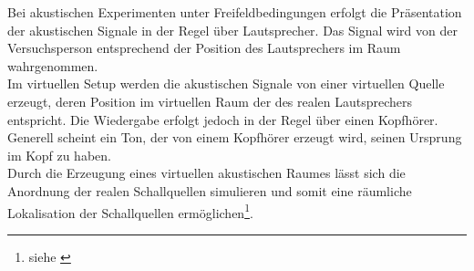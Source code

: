 

Bei akustischen Experimenten unter Freifeldbedingungen erfolgt die Präsentation der akustischen Signale in der Regel über Lautsprecher. Das Signal wird von der Versuchsperson entsprechend der Position des Lautsprechers im Raum wahrgenommen.\\
Im virtuellen Setup werden die akustischen Signale von einer virtuellen Quelle erzeugt, deren Position im virtuellen Raum der des realen Lautsprechers entspricht. Die Wiedergabe erfolgt jedoch in der Regel über einen Kopfhörer. Generell scheint ein Ton, der von einem Kopfhörer erzeugt wird, seinen Ursprung im Kopf zu haben. \\
Durch die Erzeugung eines virtuellen akustischen Raumes lässt sich die Anordnung der realen Schallquellen simulieren und somit eine räumliche Lokalisation der Schallquellen ermöglichen\footnote{siehe \cite{SLAS}}.
